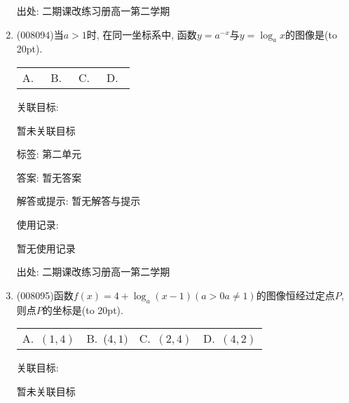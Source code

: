 \documentclass[10pt,a4paper]{article}
\newcommand{\bracket}[1]{(\hbox to #1pt{})}
\newcommand{\fourch}[4]{\par\begin{tabular}{p{.23\textwidth}p{.23\textwidth}p{.23\textwidth}p{.23\textwidth}}
A.~#1 &B.~#2& C.~#3& D.~#4
\end{tabular}}
\begin{document}
\begin{enumerate}[1.]
出处: 二期课改练习册高一第二学期
\item { (008094)}当$a>1$时, 在同一坐标系中, 函数$y=a^{-x}$与$y=\log _ax$的图像是\bracket{20}.
\fourch{\begin{tikzpicture}[scale = 0.7, >=latex]
    \draw [->] (-2,0) -- (2,0) node [below] {$x$};
    \draw [->] (0,-2) -- (0,2) node [left] {$y$};
    \draw (0,0) node [below left] {$O$};
    \draw [domain = -1:2] plot (\x, {pow(0.5,\x)});
    \draw [domain = -1:2] plot ({pow(0.5,\x)},-\x);
\end{tikzpicture}}
{\begin{tikzpicture}[scale = 0.7, >=latex]
    \draw [->] (-2,0) -- (2,0) node [below] {$x$};
    \draw [->] (0,-2) -- (0,2) node [left] {$y$};
    \draw (0,0) node [below left] {$O$};
    \draw [domain = -1:2] plot (-\x, {pow(0.5,\x)});
    \draw [domain = -1:2] plot ({pow(0.5,\x)},-\x);
\end{tikzpicture}}{\begin{tikzpicture}[scale = 0.7, >=latex]
    \draw [->] (-2,0) -- (2,0) node [below] {$x$};
    \draw [->] (0,-2) -- (0,2) node [left] {$y$};
    \draw (0,0) node [below left] {$O$};
    \draw [domain = -1:2] plot (-\x, {pow(0.5,\x)});
    \draw [domain = -1:2] plot ({pow(0.5,\x)},\x);
\end{tikzpicture}}{\begin{tikzpicture}[scale = 0.7, >=latex]
    \draw [->] (-2,0) -- (2,0) node [below] {$x$};
    \draw [->] (0,-2) -- (0,2) node [left] {$y$};
    \draw (0,0) node [below left] {$O$};
    \draw [domain = -1:2] plot (\x, {pow(0.5,\x)});
    \draw [domain = -1:2] plot ({pow(0.5,\x)},\x);
\end{tikzpicture}}


关联目标:

暂未关联目标



标签: 第二单元

答案: 暂无答案

解答或提示: 暂无解答与提示

使用记录:

暂无使用记录


出处: 二期课改练习册高一第二学期
\item { (008095)}函数$f(x)=4+\log _a(x-1)(a>0a\ne 1)$的图像恒经过定点$P$, 则点$P$的坐标是\bracket{20}.
\fourch{$(1, 4)$}{($4, 1)$}{$(2, 4)$}{$(4, 2)$}


关联目标:

暂未关联目标




\end{enumerate}
\end{document}
